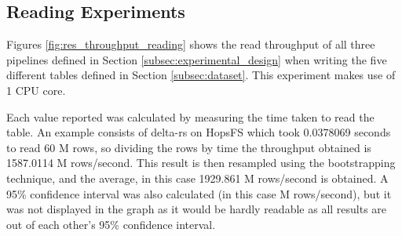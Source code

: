 \subsection{Reading Experiments}

Figures \ref{fig:res_throughput_reading} shows the read throughput of all three pipelines defined in Section \ref{subsec:experimental_design} when writing the five different tables defined in Section \ref{subsec:dataset}. This experiment makes use of 1 \gls{CPU} core. 

Each value reported was calculated by measuring the time taken to read the table. An example consists of delta-rs on \gls{HopsFS} which took 0.0378069 seconds to read 60 M rows, so dividing the rows by time the throughput obtained is 1587.0114 M rows/second. This result is then resampled using the bootstrapping technique, and the average, in this case 1929.861 M rows/second is obtained. A 95\% confidence interval was also calculated (in this case  M rows/second), but it was not displayed in the graph as it would be hardly readable as all results are out of each other's 95\% confidence interval.


